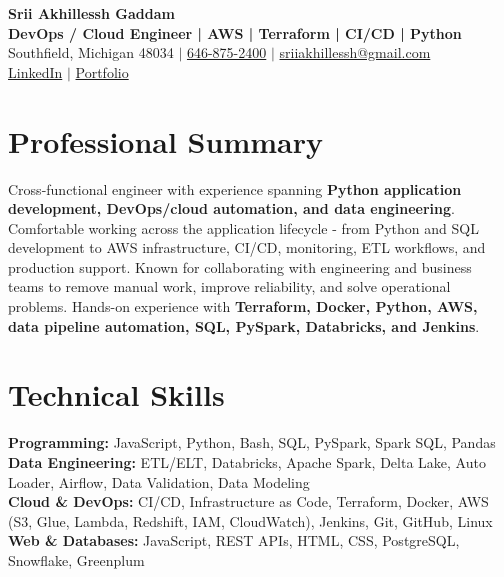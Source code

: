 \documentclass[letterpaper,10pt]{article}
\begin{document}
\fontsize{9.35pt}{10.45pt}\selectfont

\begin{center}
    {\LARGE \textbf{Srii Akhillessh Gaddam}} \\[-1pt]
    \textbf{DevOps / Cloud Engineer | AWS | Terraform | CI/CD | Python} \\[2pt]
    Southfield, Michigan 48034 $|$
    \href{tel:6468752400}{646-875-2400} $|$
    \href{mailto:sriiakhillessh@gmail.com}{sriiakhillessh@gmail.com} \\[1pt]
    \href{https://www.linkedin.com/in/srii-akhiilessh-gaddam-b48668191/}{LinkedIn} $|$
    \href{https://sriiakhillesshg.github.io/portfolio/}{Portfolio}
\end{center}
\vspace{-8pt}

\section{Professional Summary}
\small{Cross-functional engineer with experience spanning \textbf{Python application development, DevOps/cloud automation, and data engineering}. Comfortable working across the application lifecycle - from Python and SQL development to AWS infrastructure, CI/CD, monitoring, ETL workflows, and production support. Known for collaborating with engineering and business teams to remove manual work, improve reliability, and solve operational problems. Hands-on experience with \textbf{Terraform, Docker, Python, AWS, data pipeline automation, SQL, PySpark, Databricks, and Jenkins}.}

\section{Technical Skills}
\small{
\textbf{Programming:} JavaScript, Python, Bash, SQL, PySpark, Spark SQL, Pandas \\
\textbf{Data Engineering:} ETL/ELT, Databricks, Apache Spark, Delta Lake, Auto Loader, Airflow, Data Validation, Data Modeling \\
\textbf{Cloud \& DevOps:} CI/CD, Infrastructure as Code, Terraform, Docker, AWS (S3, Glue, Lambda, Redshift, IAM, CloudWatch), Jenkins, Git, GitHub, Linux \\
\textbf{Web \& Databases:} JavaScript, REST APIs, HTML, CSS, PostgreSQL, Snowflake, Greenplum
}
\end{document}

